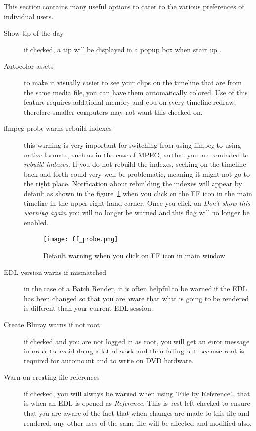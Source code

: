 This section contains many useful options to cater to the various preferences of individual users.

\begin{description}
    \item[Show tip of the day] if checked, a tip will be displayed in a popup box when start up \CGG{}.
    \item[Autocolor assets] to make it visually easier to see your clips on the timeline that are from the same media file, you can have them automatically colored. Use of this feature requires additional memory and cpu on every timeline redraw, therefore smaller computers may not want this checked on.
    \item[ffmpeg probe warns rebuild indexes] this warning is very important for switching from using ffmpeg to using native formats, such as in the case of MPEG, so that you are reminded to \textit{rebuild indexes}.  If you do not rebuild the indexes, seeking on the timeline back and forth could very well be problematic, meaning it might not go to the right place.  Notification about rebuilding the indexes will appear by default as shown in the figure~\ref{fig:ff_probe} when you click on the FF icon in the main timeline in the upper right hand corner.  Once you click on \textit{Don’t show this warning again} you will no longer be warned and this flag will no longer be enabled.
    \begin{figure}[htpb]
        \centering \texttt{[image: ff\_probe.png]}
        \caption{Default warning when you click on FF icon in main window}
        \label{fig:ff_probe}
    \end{figure}
    \item[EDL version warns if mismatched] in the case of a Batch Render, it is often helpful to be warned if the EDL has been changed so that you are aware that what is going to be rendered is different than your current EDL session.
    \item[Create Bluray warns if not root] if checked and you are not logged in as root, you will get an error message in order to avoid doing a lot of work and then failing out because root is required for automount and to write on DVD hardware.
    \item[Warn on creating file references] if checked, you will always be warned when using "File by 
Reference", that is when an EDL is opened as \textit{Reference}.  This is best left checked to ensure that you are aware of the fact that when changes are made
to this file and rendered, any other uses of the same file will be affected and modified also.

\end{description}
